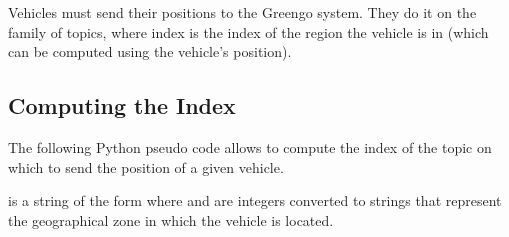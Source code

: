\documentclass[letterpaper,10pt,english]{sphinxmanual}
\begin{document}
\section{}
\label{\detokenize{pubsub:vehicle-positions}}
Vehicles must send their positions to the Greengo system.
They do it on the  family of topics, where index is the index of the region the vehicle is in (which can be computed using the vehicle’s position).


\subsection{Computing the Index}
\label{\detokenize{pubsub:computing-the-index}}
The following Python pseudo code allows to compute the index of the  topic on which to send the position of a given vehicle.

 is a string of the form  where  and  are integers converted to strings that represent the geographical zone in which the vehicle is located.

\begin{sphinxVerbatim}[commandchars=\\\{\}]
    

   
           
           
         

   
       
\end{sphinxVerbatim}
\end{document}
